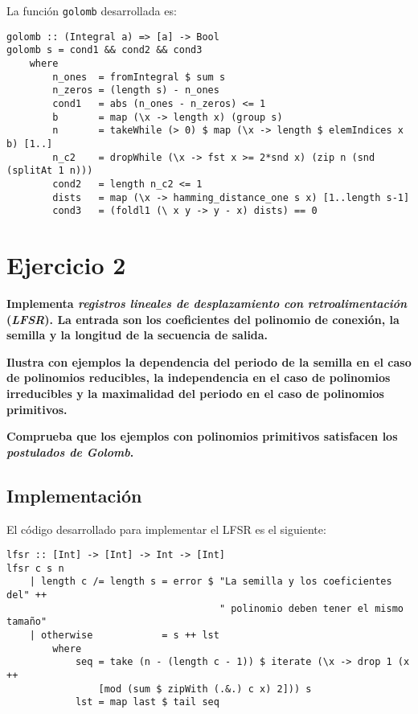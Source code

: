 \documentclass[10pt,spanish]{article}
\begin{document}
La función \texttt{golomb} desarrollada es:

\begin{verbatim}
golomb :: (Integral a) => [a] -> Bool
golomb s = cond1 && cond2 && cond3
    where
        n_ones  = fromIntegral $ sum s
        n_zeros = (length s) - n_ones
        cond1   = abs (n_ones - n_zeros) <= 1
        b       = map (\x -> length x) (group s)
        n       = takeWhile (> 0) $ map (\x -> length $ elemIndices x b) [1..]
        n_c2    = dropWhile (\x -> fst x >= 2*snd x) (zip n (snd (splitAt 1 n))) 
        cond2   = length n_c2 <= 1
        dists   = map (\x -> hamming_distance_one s x) [1..length s-1]
        cond3   = (foldl1 (\ x y -> y - x) dists) == 0
\end{verbatim}

\section{\textcolor{azul}Ejercicio 2}
\textbf{Implementa \textit{\textcolor{azul}{registros lineales de desplazamiento con retroalimentación}} (\textit{\textcolor{azul}{LFSR}}). La entrada son los coeficientes del polinomio de conexión, la semilla y la longitud de la secuencia de salida.}

\textbf{Ilustra con ejemplos la dependencia del periodo de la semilla en el caso de polinomios reducibles, la independencia en el caso de polinomios irreducibles y la maximalidad del periodo en el caso de polinomios primitivos.}

\textbf{Comprueba que los ejemplos con polinomios primitivos satisfacen los \textit{\textcolor{azul}{postulados de Golomb}}.}

\subsection{\textcolor{azul}Implementación}
El código desarrollado para implementar el LFSR es el siguiente:

\begin{verbatim}
lfsr :: [Int] -> [Int] -> Int -> [Int]
lfsr c s n
    | length c /= length s = error $ "La semilla y los coeficientes del" ++
                                     " polinomio deben tener el mismo tamaño"
    | otherwise            = s ++ lst
        where
            seq = take (n - (length c - 1)) $ iterate (\x -> drop 1 (x ++ 
                [mod (sum $ zipWith (.&.) c x) 2])) s
            lst = map last $ tail seq
\end{verbatim}
\end{document}
